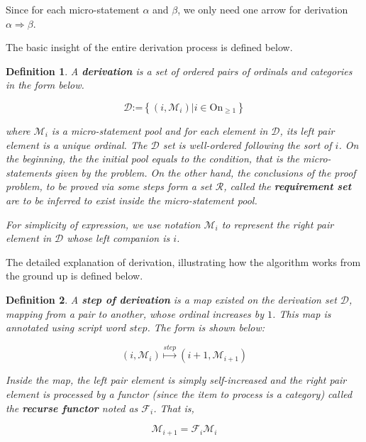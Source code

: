 \documentclass{aims}
\newtheorem{definition}{Definition}	%
\numberwithin{theorem}{section}	%
\numberwithin{axiom}{section}	%
\numberwithin{definition}{section}	%
\begin{document}
Since for each micro-statement \(\alpha\) and \(\beta\), we only need one arrow for derivation \(\alpha \Rightarrow \beta\).

The basic insight of the entire derivation process is defined below.

\begin{definition}
	A \textbf{ derivation} is a set of ordered pairs of ordinals and categories in the form below. 
	
	\begin{equation}
		\mathcal{D}\text{:=}\left\{\left(i,\mathcal{M}_i\right)|i\in \text{On}_{\geq 1}\right\}
	\end{equation}
	
	\noindent where \(\mathcal{M}_i\) { }is a micro-statement pool and for each element in \(\mathcal{D}\), its left pair element is a unique ordinal. The $\mathcal{D}$ set is well-ordered following the sort of \(i\). On the beginning, the the initial pool equals to the condition, that is the micro-statements given by the problem. On the other hand, the conclusions of the proof problem, to be proved via some steps form a set \(\mathcal{R}\), called the \textbf{requirement set} are to be inferred to exist inside the micro-statement pool.
	
	For simplicity of expression, we use notation \(\mathcal{M}_i\) to represent the right pair element in $\mathcal{D}$ { }whose left companion is \(i\).
\end{definition}

The detailed explanation of derivation, illustrating how the algorithm works from the ground up is defined below.

\begin{definition}
	A \textbf{ step of derivation} is a map existed on the derivation set \(\mathcal{D}\), mapping from a pair to another, whose ordinal increases by \(1\). This map is annotated using script word \(\mathit{s}\mathit{t}\mathit{e}\mathit{p}\). The form is shown below:
	
	\begin{equation}
		\left(i,\mathcal{M}_i\right)\overset{\mathit{s}\mathit{t}\mathit{e}\mathit{p}}{\mapsto }\left(i+1,\mathcal{M}_{i+1}\right)
	\end{equation}
	
	Inside the map, the left pair element is simply self-increased and the right pair element is processed by a functor (since the item to process is a category) called the \textbf{ recurse functor} noted as \(\mathcal{F}_i\). That is,
	
	\begin{equation}
		\mathcal{M}_{i+1}=\mathcal{F}_i\mathcal{M}_i
	\end{equation}
\end{definition}
\end{document}
